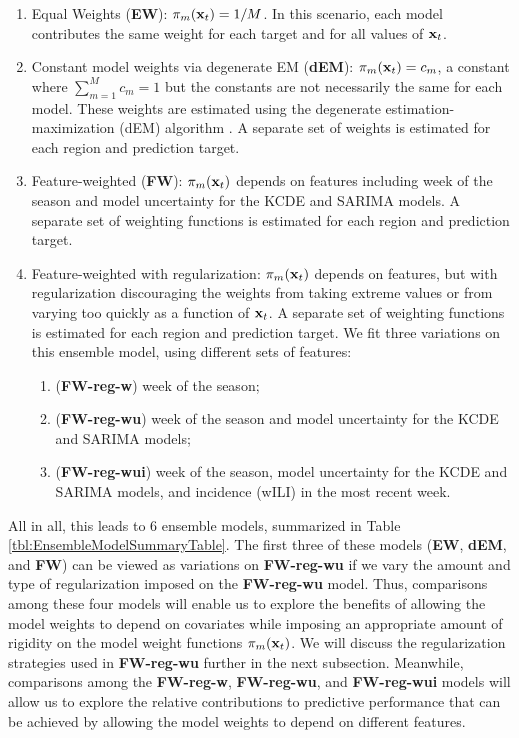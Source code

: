 \documentclass[10pt,letterpaper]{article}
\providecommand{\tightlist}{%
  \setlength{\itemsep}{0pt}\setlength{\parskip}{0pt}}
\begin{document}
\begin{enumerate}
\def\labelenumi{\arabic{enumi}.}
\item
  Equal Weights (\textbf{EW}): \(\pi_m({\bf x}_t) = 1/M\). In this scenario,
  each model contributes the same weight for each target and for all
  values of \({\bf x}_t\).
\item
  Constant model weights via degenerate EM (\textbf{dEM}):
  \(\pi_m({\bf x}_t) = c_m\), a constant where \(\sum_{m=1}^M c_m = 1\) but
  the constants are not necessarily the same for each model. These
  weights are estimated using the degenerate estimation-maximization
  (dEM) algorithm \cite{Lin2004}. A separate set of weights is estimated
  for each region and prediction target.
\item
  Feature-weighted (\textbf{FW}): \(\pi_m({\bf x}_t)\) depends on features
  including week of the season and model uncertainty for the KCDE and
  SARIMA models. A separate set of weighting functions is estimated for
  each region and prediction target.
\item
  Feature-weighted with regularization: \(\pi_m({\bf x}_t)\) depends on
  features, but with regularization discouraging the weights from taking
  extreme values or from varying too quickly as a function of \({\bf x}_t\).
  A separate set of weighting functions is estimated for each region and
  prediction target. We fit three variations on this ensemble model,
  using different sets of features:

  \begin{enumerate}
  \def\labelenumii{\alph{enumii}.}
  \tightlist
  \item
    (\textbf{FW-reg-w}) week of the season;
  \item
    (\textbf{FW-reg-wu}) week of the season and model uncertainty for
    the KCDE and SARIMA models;
  \item
    (\textbf{FW-reg-wui}) week of the season, model uncertainty for the
    KCDE and SARIMA models, and incidence (wILI) in the most recent
    week.
  \end{enumerate}
\end{enumerate}

All in all, this leads to 6 ensemble models, summarized in Table
\ref{tbl:EnsembleModelSummaryTable}. The first three of these models
(\textbf{EW}, \textbf{dEM}, and \textbf{FW}) can be viewed as variations
on \textbf{FW-reg-wu} if we vary the amount and type of regularization
imposed on the \textbf{FW-reg-wu} model. Thus, comparisons among these
four models will enable us to explore the benefits of allowing the model
weights to depend on covariates while imposing an appropriate amount of
rigidity on the model weight functions \(\pi_m({\bf x}_t)\). We will discuss
the regularization strategies used in \textbf{FW-reg-wu} further in the
next subsection. Meanwhile, comparisons among the \textbf{FW-reg-w},
\textbf{FW-reg-wu}, and \textbf{FW-reg-wui} models will allow us to
explore the relative contributions to predictive performance that can be
achieved by allowing the model weights to depend on different features.
\end{document}
